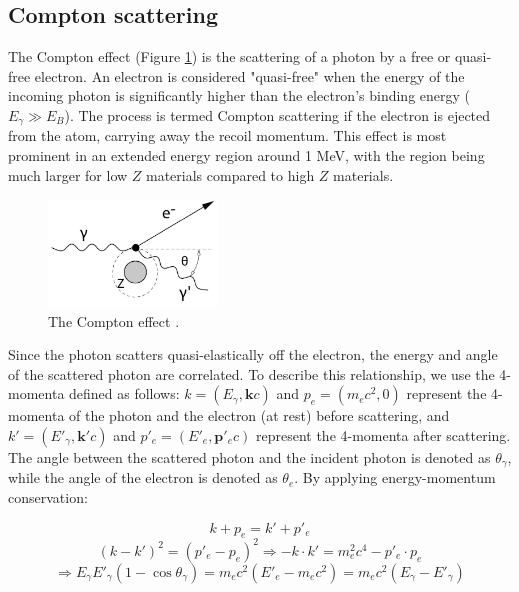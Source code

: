 \subsection{Compton scattering}\label{compton}
The Compton effect (Figure \ref{fig:compt}) is the 
scattering of a photon by a free or quasi-free electron. 
An electron is considered "quasi-free" when the energy of 
the incoming photon is significantly higher than the 
electron's binding energy ($E_\gamma \gg E_B$). The 
process is termed Compton scattering if the 
electron is ejected from the atom, carrying away the 
recoil momentum. This effect is most prominent in an 
extended energy region around 1 MeV, with the region 
being much larger for low $Z$ materials compared to high $Z$ materials.

\begin{figure}[!h]
    \centering
    \includegraphics[width =0.4\textwidth]{figures/png/Screenshot_20240812_204345.png}
    \caption[The Compton effect.]{
    The Compton effect \cite{kola}.}
    \label{fig:compt}
\end{figure}

Since the photon scatters quasi-elastically off the electron, 
the energy and angle of the scattered photon are correlated. 
To describe this relationship, we use the 4-momenta defined as 
follows: $k = (E_\gamma, \mathbf{k}c)$ and $p_e = (m_e c^2, 0)$ 
represent the 4-momenta of the photon and the electron (at rest) 
before scattering, and $k' = (E'_\gamma, \mathbf{k}'c)$ and 
$p'_e = (E'_e, \mathbf{p}'_e c)$ represent the 4-momenta 
after scattering. The angle between the scattered photon and 
the incident photon is denoted as $\theta_\gamma$, while the 
angle of the electron is denoted as $\theta_e$. By applying 
energy-momentum conservation:

\begin{equation}\label{compcons}
k + p_e = k' + p'_e
\end{equation}
\begin{equation}\label{compcons2}
(k - k')^2 = (p'_e - p_e)^2 \Rightarrow -k \cdot k' = m_e^2 c^4 - p'_e \cdot p_e
\end{equation}
\begin{equation}
\Rightarrow E_\gamma E'_\gamma (1 - \cos \theta_\gamma) = m_e c^2 \left(E'_e - m_e c^2\right) = m_e c^2 \left(E_\gamma - E'_\gamma \right)
\end{equation}

